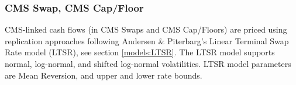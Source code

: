 \subsubsection{CMS Swap, CMS Cap/Floor}
\label{pricing:ir_cms}

CMS-linked cash flows (in CMS Swaps and CMS Cap/Floors) are priced using 
replication approaches following Andersen \& Piterbarg's Linear Terminal Swap 
Rate model (LTSR), see section \ref{models:LTSR}. The LTSR model supports normal, 
log-normal, and shifted log-normal volatilities. LTSR model parameters are 
Mean Reversion, and upper and lower rate bounds.
